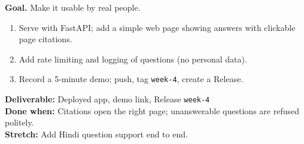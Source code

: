 \begin{tcolorbox}[enhanced,breakable,colback=white,colframe=sun,boxrule=0.8pt,arc=2pt,left=7pt,right=7pt,top=4pt,bottom=4pt,
  title={\bfseries Saturday --- Deploy PolicyGPT\hfill\normalfont\small 3 h},coltitle=white,colbacktitle=sun,fonttitle=\small]
\textbf{Goal.} Make it usable by real people.
\begin{enumerate}[itemsep=1pt,topsep=2pt]
  \item Serve with FastAPI; add a simple web page showing answers with clickable page citations.
  \item Add rate limiting and logging of questions (no personal data).
  \item Record a 5-minute demo; push, tag \texttt{week-4}, create a Release.
\end{enumerate}
\textbf{\color{dataC}Deliverable:} Deployed app, demo link, Release \texttt{week-4}\\
\textbf{\color{navy}Done when:} Citations open the right page; unanswerable questions are refused politely.\\
\textbf{\color{skillC}Stretch:} Add Hindi question support end to end.
\end{tcolorbox}

